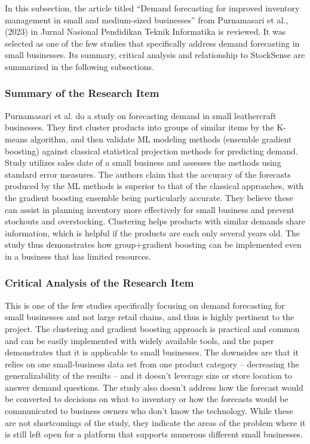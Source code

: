 \documentclass{StockSense}
\begin{document}
In this subsection, the article titled ``Demand forecasting for improved inventory management in small and medium-sized businesses'' from Purnamasari et al., (2023) in Jurnal Nasional Pendidikan Teknik Informatika is reviewed. It was selected as one of the few studies that specifically address demand forecasting in small businesses. Its summary, critical analysis and relationship to StockSense are summarized in the following subsections.

\subsubsection{Summary of the Research Item}

Purnamasari et al. \cite{purnamasari2023demand} do a study on forecasting demand in small leathercraft businesses. They first cluster products into groups of similar items by the K-means algorithm, and then validate ML modeling methods (ensemble gradient boosting) against classical statistical projection methods for predicting demand. Study utilizes sales date of a small business and assesses the methods using standard error measures. The authors claim that the accuracy of the forecasts produced by the ML methods is superior to that of the classical approaches, with the gradient boosting ensemble being particularly accurate. They believe these can assist in planning inventory more effectively for small business and prevent stockouts and overstocking. Clustering helps products with similar demands share information, which is helpful if the products are each only several years old. The study thus demonstrates how group+gradient boosting can be implemented even in a business that has limited resources.

\subsubsection{Critical Analysis of the Research Item}

This is one of the few studies specifically focusing on demand forecasting for small businesses and not large retail chains, and thus is highly pertinent to the project. The clustering and gradient boosting approach is practical and common and can be easily implemented with widely available tools, and the paper demonstrates that it is applicable to small businesses. The downsides are that it relies on one small-business data set from one product category – decreasing the generalizability of the results – and it doesn't leverage size or store location to answer demand questions. The study also doesn't address how the forecast would be converted to decisions on what to inventory or how the forecasts would be communicated to business owners who don't know the technology. While these are not shortcomings of the study, they indicate the areas of the problem where it is still left open for a platform that supports numerous different small businesses.
\end{document}
